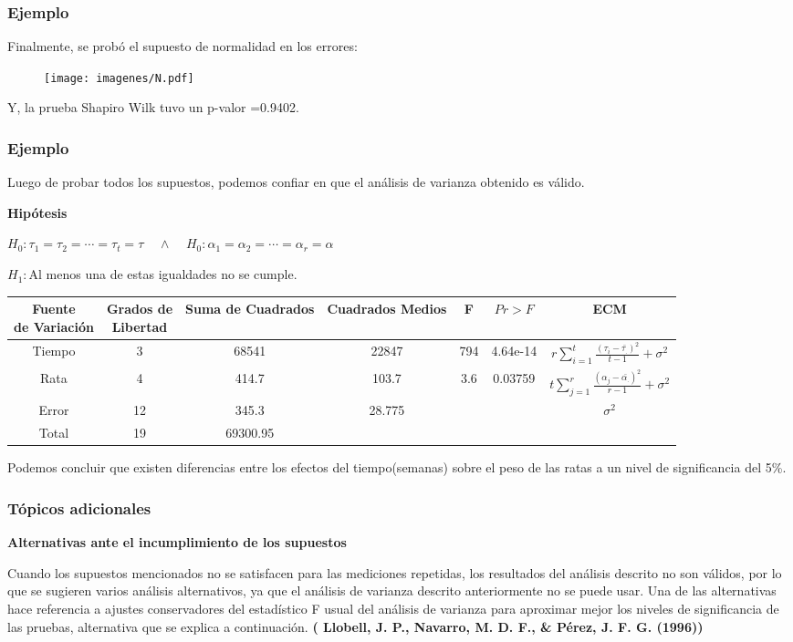 \documentclass[12pt]{beamer}
\begin{document}
\begin{frame}
\frametitle{Ejemplo}
Finalmente, se probó el supuesto de normalidad en los errores:
\begin{figure}[h!]
  \centering
  \texttt{[image: imagenes/N.pdf]}
\end{figure}
Y, la prueba Shapiro Wilk tuvo un p-valor =0.9402.
\end{frame}

\begin{frame}
\frametitle{Ejemplo}
Luego de probar todos los supuestos, podemos confiar en que el análisis de varianza obtenido es válido.

\textbf{Hipótesis}
\begin{center}
$H_0:\tau_1=\tau_2=\cdots=\tau_t=\tau \;\;\;\; \wedge \;\;\;\; H_0:\alpha_1=\alpha_2=\cdots=\alpha_r=\alpha $

$H_1:$Al menos una de estas igualdades no se cumple.
\end{center}
\begin{table}[htbp]
  \centering
\resizebox{12cm}{!} {
\begin{tabular}{|c|c|c|c|c|c|c|}
\hline 
\parbox{7em}{\centering Fuente\\ de Variación} & \parbox{7em}{\centering Grados de\\ Libertad} & Suma de Cuadrados & Cuadrados Medios & F & $Pr>F$ & ECM \\ 
\hline 
Tiempo & 3 & 68541 & 22847 & 794 & 4.64e-14  & $r\sum\limits_{i=1}^{t}\frac{(\tau_i-\bar{\tau_{.}})^2}{t-1}+\sigma^2$\\ 
Rata & 4 & 414.7 & 103.7 & 3.6 & 0.03759 &$t\sum\limits_{j=1}^{r}\frac{(\alpha_{j}-\bar{\alpha_{.}})^2}{r-1}+\sigma^2$ \\
Error & 12 & 345.3 & 28.775 &   & & $\sigma^2$\\ 
Total & 19 & 69300.95 &  &   & &\\ 
\hline 
\end{tabular} 
}
\label{tab:addlabel}%
\end{table}%
Podemos concluir que existen diferencias entre los efectos del tiempo(semanas) sobre el peso de las ratas a un nivel de
significancia del 5\%.
\end{frame}

\begin{frame}
\frametitle{Tópicos adicionales}
\textbf{Alternativas ante el incumplimiento de los supuestos}

Cuando los supuestos mencionados no se satisfacen para las mediciones repetidas, los resultados
del análisis descrito no son válidos, por lo que se sugieren varios análisis alternativos, ya que el
análisis de varianza descrito anteriormente no se puede usar. Una de las alternativas hace
referencia a ajustes conservadores del estadístico F usual del análisis de varianza para aproximar
mejor los niveles de significancia de las pruebas, alternativa que se explica a continuación.
\textbf{( Llobell, J. P., Navarro, M. D. F., \& Pérez, J. F. G. (1996))}
\end{frame}
\end{document}
